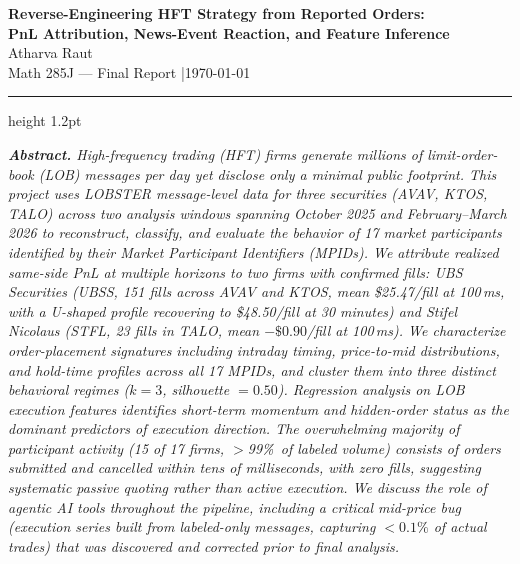 \documentclass[11pt, letterpaper]{article}
\begin{document}
\begin{center}
  {\LARGE\bfseries\color{accent}
    Reverse-Engineering HFT Strategy from Reported Orders:\\[4pt]
    PnL Attribution, News-Event Reaction, and Feature Inference
  }\\[10pt]
  {\large Atharva Raut}\\[4pt]
  {\normalsize Math 285J --- Final Report \quad|\quad \today}
\end{center}

\vspace{6pt}
\hrule height 1.2pt
\vspace{14pt}

\begin{center}
\begin{minipage}{0.92\textwidth}
\small\itshape
\textbf{Abstract.}
High-frequency trading (HFT) firms generate millions of limit-order-book (LOB)
messages per day yet disclose only a minimal public footprint.
This project uses LOBSTER message-level data for three securities (AVAV, KTOS, TALO)
across two analysis windows spanning October 2025 and February--March 2026 to
reconstruct, classify, and evaluate the behavior of 17 market participants
identified by their Market Participant Identifiers (MPIDs).
We attribute realized same-side PnL at multiple horizons to two firms with confirmed
fills: UBS Securities (UBSS, 151 fills across AVAV and KTOS, mean \$25.47/fill at 100\,ms,
with a U-shaped profile recovering to \$48.50/fill at 30 minutes) and Stifel Nicolaus
(STFL, 23 fills in TALO, mean $-\$0.90$/fill at 100\,ms).
We characterize order-placement signatures including intraday timing, price-to-mid
distributions, and hold-time profiles across all 17 MPIDs, and cluster them into
three distinct behavioral regimes ($k=3$, silhouette $= 0.50$).
Regression analysis on LOB execution features identifies short-term momentum and
hidden-order status as the dominant predictors of execution direction.
The overwhelming majority of participant activity (15 of 17 firms, $>$99\%\ of
labeled volume) consists of orders submitted and cancelled within tens of
milliseconds, with zero fills, suggesting systematic passive quoting rather than
active execution.
We discuss the role of agentic AI tools throughout the pipeline, including
a critical mid-price bug (execution series built from labeled-only messages, capturing
$<0.1\%$ of actual trades) that was discovered and corrected prior to final analysis.
\end{minipage}
\end{center}
\end{document}
